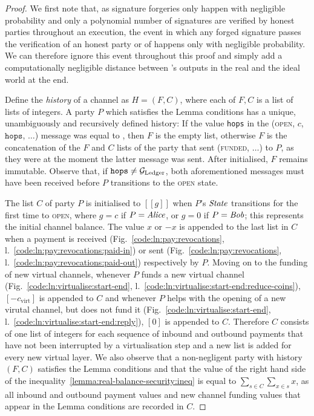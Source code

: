 \begin{proof}
  We first note that, as signature forgeries only happen with negligible
  probability and only a polynomial number of signatures are verified by honest
  parties throughout an execution, the event in which any forged signature
  passes the verification of an honest party or of \ledger happens only with
  negligible probability. We can therefore ignore this event throughout this
  proof and simply add a computationally negligible distance between
  \environment's outputs in the real and the ideal world at the end.

  Define the \emph{history} of a channel as $H = (F, C)$, where each of $F, C$
  is a list of lists of integers. A party $P$ which satisfies the Lemma
  conditions has a unique, unambiguously and recursively defined history: If the
  value \texttt{hops} in the (\textsc{open}, $c$, $\texttt{hops}$, $\dots$)
  message was equal to \ledger, then $F$ is the empty list, otherwise $F$ is the
  concatenation of the $F$ and $C$ lists of the party that sent
  (\textsc{funded}, $\dots$) to $P$, as they were at the moment the latter
  message was sent. After initialised, $F$ remains immutable. Observe that, if
  $\texttt{hops} \neq \mathcal{G}_{\mathrm{Ledger}}$, both aforementioned messages must have been
  received before $P$ transitions to the \textsc{open} state.

  The list $C$ of party $P$ is initialised to $[[g]]$ when $P$'s $\itistate$
  transitions for the first time to \textsc{open}, where $g = c$ if $P =
  \mathit{Alice}$, or $g = 0$ if $P = \mathit{Bob}$; this represents the initial channel
  balance. The value $x$ or $-x$ is appended to the last list in $C$ when a
  payment is received (Fig.~\ref{code:ln:pay:revocations},
  l.~\ref{code:ln:pay:revocations:paid-in}) or sent
  (Fig.~\ref{code:ln:pay:revocations},
  l.~\ref{code:ln:pay:revocations:paid-out}) respectively by $P$. Moving on to
  the funding of new virtual channels, whenever $P$ funds a new virtual channel
  (Fig.~\ref{code:ln:virtualise:start-end},
  l.~\ref{code:ln:virtualise:start-end:reduce-coins}), $[-c_{\mathrm{virt}}]$
  is appended to $C$ and whenever $P$ helps with the opening of a new virutal
  channel, but does not fund it (Fig.~\ref{code:ln:virtualise:start-end},
  l.~\ref{code:ln:virtualise:start-end:reply}), $[0]$ is appended to $C$.
  Therefore $C$ consists of one list of integers for each sequence of inbound
  and outbound payments that have not been interrupted by a virtualisation step
  and a new list is added for every new virtual layer. We also observe that a
  non-negligent party with history $(F, C)$ satisfies the Lemma conditions and
  that the value of the right hand side of the
  inequality~\ref{lemma:real-balance-security:ineq} is equal to $\sum\limits_{s
  \in C} \sum\limits_{x \in s} x$, as all inbound and outbound payment values
  and new channel funding values that appear in the Lemma conditions are
  recorded in $C$.


\end{proof}
